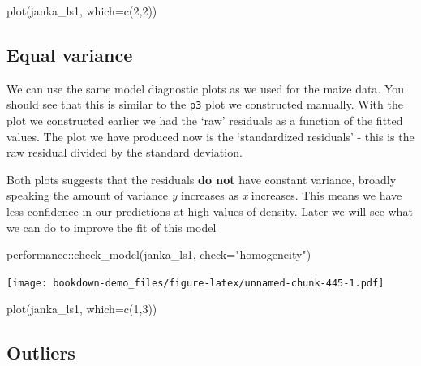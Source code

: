 \documentclass[
]{book}
\newenvironment{Shaded}{\begin{snugshade}}{\end{snugshade}}
\newcommand{\AttributeTok}[1]{\textcolor[rgb]{0.77,0.63,0.00}{#1}}
\newcommand{\DecValTok}[1]{\textcolor[rgb]{0.00,0.00,0.81}{#1}}
\newcommand{\FunctionTok}[1]{\textcolor[rgb]{0.00,0.00,0.00}{#1}}
\newcommand{\NormalTok}[1]{#1}
\newcommand{\SpecialCharTok}[1]{\textcolor[rgb]{0.00,0.00,0.00}{#1}}
\newcommand{\StringTok}[1]{\textcolor[rgb]{0.31,0.60,0.02}{#1}}
\begin{document}
\begin{Shaded}
\begin{Highlighting}[]
\FunctionTok{plot}\NormalTok{(janka\_ls1, }\AttributeTok{which=}\FunctionTok{c}\NormalTok{(}\DecValTok{2}\NormalTok{,}\DecValTok{2}\NormalTok{))}
\end{Highlighting}
\end{Shaded}

\hypertarget{equal-variance-1}{%
\subsection{Equal variance}\label{equal-variance-1}}

We can use the same model diagnostic plots as we used for the maize data.
You should see that this is similar to the \texttt{p3} plot we constructed manually. With the plot we constructed earlier we had the `raw' residuals as a function of the fitted values. The plot we have produced now is the `standardized residuals' - this is the raw residual divided by the standard deviation.

Both plots suggests that the residuals \textbf{do not} have constant variance, broadly speaking the amount of variance \emph{y} increases as \emph{x} increases. This means we have less confidence in our predictions at high values of density. Later we will see what we can do to improve the fit of this model

\begin{Shaded}
\begin{Highlighting}[]
\NormalTok{performance}\SpecialCharTok{::}\FunctionTok{check\_model}\NormalTok{(janka\_ls1, }\AttributeTok{check=}\StringTok{"homogeneity"}\NormalTok{)}
\end{Highlighting}
\end{Shaded}

\texttt{[image: bookdown-demo\_files/figure-latex/unnamed-chunk-445-1.pdf]}

\begin{Shaded}
\begin{Highlighting}[]
\FunctionTok{plot}\NormalTok{(janka\_ls1, }\AttributeTok{which=}\FunctionTok{c}\NormalTok{(}\DecValTok{1}\NormalTok{,}\DecValTok{3}\NormalTok{))}
\end{Highlighting}
\end{Shaded}

\hypertarget{outliers-1}{%
\subsection{Outliers}\label{outliers-1}}
\end{document}
